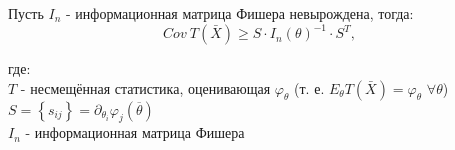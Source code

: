 	\begin{Lemma}\label{CramerRaoInequall}
		Пусть $I_n$ - информационная матрица Фишера невырождена, тогда:
		$$
		Cov\ T\left(\bar{X}\right)\ge S \cdot I_n \left(\theta\right)^{-1}\cdot S^T,
		$$
		\begin{flushleft}
			{\setlength{\leftskip}{5em}
				\setlength{\rightskip}{5em}
		где:
		\\
		$T$ - несмещённая статистика, оценивающая $\varphi_\theta$ (т. е. $E_{\theta}T\left(\bar{X}\right)=\varphi_\theta$ $\forall \theta$)
		\\
		$S=\left\{s_{ij}\right\}=\partial_{\theta_i}\varphi_j\left(\overline{\theta}\right)$
		\\
		$I_n$ - информационная матрица Фишера
		\\
		}
		\end{flushleft}
	\end{Lemma}
	
	\newpage

